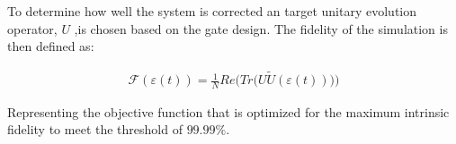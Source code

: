 \documentclass{article}
\begin{document}
To determine how well the system is corrected an target unitary evolution operator, $U$ ,is chosen based on the gate design. The fidelity of the simulation is then defined as:
\begin{center}
\begin{align}
  \mathscr{F}(\varepsilon(t)) = \frac{1}{N} Re \Big(Tr \big(U\tilde{U}(\varepsilon(t))\big) \Big)
\end{align}
\end{center}

Representing the objective function that is optimized for the maximum intrinsic fidelity to meet the threshold of $99.99\%$. 
\end{document}
